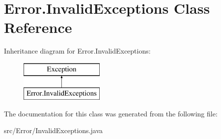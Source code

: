 \hypertarget{class_error_1_1_invalid_exceptions}{}\section{Error.\+Invalid\+Exceptions Class Reference}
\label{class_error_1_1_invalid_exceptions}
Inheritance diagram for Error.\+Invalid\+Exceptions\+:\begin{figure}[H]
\begin{center}
\leavevmode
\includegraphics[height=2.000000cm]{class_error_1_1_invalid_exceptions}
\end{center}
\end{figure}


The documentation for this class was generated from the following file\+:\begin{DoxyCompactItemize}
\item 
src/\+Error/Invalid\+Exceptions.\+java\end{DoxyCompactItemize}
